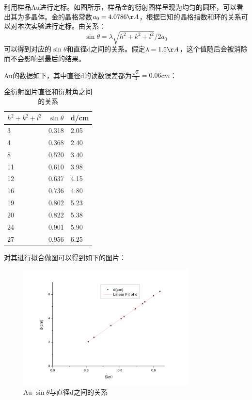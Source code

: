 \documentclass[aps,pre,12pt,preprint,onecolumn,showpacs,showkeys,UTF8]{revtex4-1}
\begin{document}
利用样品Au进行定标。如图所示，样品金的衍射图样呈现为均匀的圆环，可以看出其为多晶体。金的晶格常数$a_0=4.0786\AA$，根据已知的晶格指数和环的关系可以对本次实验进行定标。由关系：
\begin{equation}
	\sin{\theta}=\lambda\sqrt{h^2+k^2+l^2}/2a_0
\end{equation}
可以得到对应的$\sin{\theta}$和直径d之间的关系。假定$\lambda=1.5\AA$，这个值随后会被消除而不会影响到最后的结果。

Au的数据如下，其中直径d的读数误差都为$\frac{\sqrt{3}}{3}=0.06cm$：
\begin{center}
	\begin{table}[h]
		\caption{金衍射图片直径和衍射角之间的关系}
		\begin{tabularx}{10cm}{XXX}
			\hline
			\hline
			$h^2+k^2+l^2$&$\sin{\theta}$&d/cm\\
			\hline
			3&0.318&2.05\\
			4&0.368&2.40\\
			8&0.520&3.40\\
			11&0.610&3.98\\
			12&0.637&4.15\\
			16&0.736&4.80\\
			19&0.802&5.23\\
			20&0.822&5.38\\
			24&0.901&5.90\\
			27&0.956&6.25\\
			\hline
			\hline
		\end{tabularx}
	\end{table}
\end{center}

对其进行拟合做图可以得到如下的图片：

\begin{figure}[h]
	\begin{center}
		\includegraphics[width=0.8\textwidth]{pic6.png}
		\caption{\label{fig:exp2}Au $\sin{\theta}$与直径d之间的关系}
	\end{center}
\end{figure}
\newpage
\end{document}
